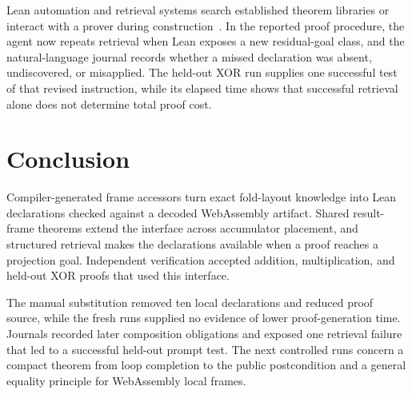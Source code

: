 \documentclass[10pt]{article}
\begin{document}
Lean automation and retrieval systems search established theorem libraries or interact with a prover during construction~\cite{Limperg2023Aesop,Yang2023LeanDojo}.  In the reported proof procedure, the agent now repeats retrieval when Lean exposes a new residual-goal class, and the natural-language journal records whether a missed declaration was absent, undiscovered, or misapplied.  The held-out XOR run supplies one successful test of that revised instruction, while its elapsed time shows that successful retrieval alone does not determine total proof cost.

\section{Conclusion}

Compiler-generated frame accessors turn exact fold-layout knowledge into Lean declarations checked against a decoded WebAssembly artifact.  Shared result-frame theorems extend the interface across accumulator placement, and structured retrieval makes the declarations available when a proof reaches a projection goal.  Independent verification accepted addition, multiplication, and held-out XOR proofs that used this interface.

The manual substitution removed ten local declarations and reduced proof source, while the fresh runs supplied no evidence of lower proof-generation time.  Journals recorded later composition obligations and exposed one retrieval failure that led to a successful held-out prompt test.  The next controlled runs concern a compact theorem from loop completion to the public postcondition and a general equality principle for WebAssembly local frames.



\end{document}
